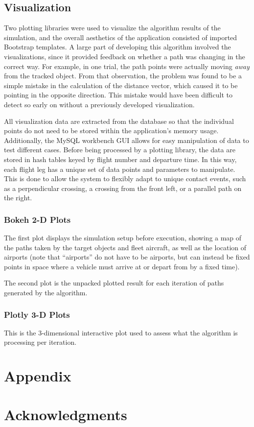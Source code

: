\documentclass[conf]{new-aiaa}
\begin{document}
\subsection{Visualization}
Two plotting libraries were used to visualize the algorithm results of the simulation, and the overall aesthetics of the application consisted of imported Bootstrap templates. A large part of developing this algorithm involved the visualizations, since it provided feedback on whether a path was changing in the correct way. For example, in one trial, the path points were actually moving \emph{away} from the tracked object. From that observation, the problem was found to be a simple mistake in the calculation of the distance vector, which caused it to be pointing in the opposite direction. This mistake would have been difficult to detect so early on without a previously developed visualization.

All visualization data are extracted from the database so that the individual points do not need to be stored within the application's memory usage. Additionally, the MySQL workbench GUI allows for easy manipulation of data to test different cases. Before being processed by a plotting library, the data are stored in hash tables keyed by flight number and departure time. In this way, each flight leg has a unique set of data points and parameters to manipulate. This is done to allow the system to flexibly adapt to unique contact events, such as a perpendicular crossing, a crossing from the front left, or a parallel path on the right.

\subsubsection{Bokeh 2-D Plots}
The first plot displays the simulation setup before execution, showing a map of the paths taken by the target objects and fleet aircraft, as well as the location of airports (note that ``airports'' do not have to be airports, but can instead be fixed points in space where a vehicle must arrive at or depart from by a fixed time). 

The second plot is the unpacked plotted result for each iteration of paths generated by the algorithm.

\subsubsection{Plotly 3-D Plots}
This is the 3-dimensional interactive plot used to assess what the algorithm is processing per iteration.

\fi





\section*{Appendix}


\section*{Acknowledgments}



\end{document}
